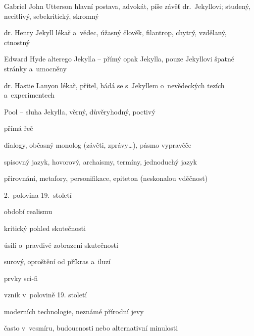 {\newpart

\begin{compactdesc}
	\item[Gabriel John Utterson] hlavní postava, advokát, píše závěť
		dr.~Jekyllovi; studený, necitlivý, sebekritický, skromný
	\item[dr. Henry Jekyll] lékař a~vědec, úžasný člověk, filantrop, chytrý,
		vzdělaný, ctnostný
	\item[Edward Hyde] alterego Jekylla – přímý opak Jekylla, pouze Jekyllovi
		špatné stránky a~umocněny
	\item[dr. Hastie Lanyon] lékař, přítel, hádá se s~Jekyllem o~nevědeckých
		tezích a~experimentech 
	\item[Pool] – sluha Jekylla, věrný, důvěryhodný, poctivý
\end{compactdesc}


přímá řeč

dialogy, občasný monolog (závěti, zprávy\dots), pásmo vypravěče

\newpart

spisovný jazyk, hovorový, archaismy, termíny, jednoduchý jazyk


přirovnání, metafory, personifikace, epiteton (neskonalou vděčnost)

\begin{compactitem}
	\item 2.~polovina 19.~století
	\item období realismu
		\begin{compactitem}
			\item kritický pohled skutečnosti
			\item úsilí o~pravdivé zobrazení skutečnosti
			\item surový, oproštění od příkras a~iluzí
		\end{compactitem}
	\item prvky sci-fi
		\begin{compactitem}
			\item vznik v~polovině 19. století
			\item moderních technologie, neznámé přírodní jevy
			\item často v~vesmíru, budoucnosti nebo alternativní minulosti
		\end{compactitem}
\end{compactitem}

}
